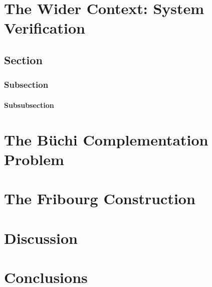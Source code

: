 \documentclass{scrreprt}
\begin{document}



\chapter{The Wider Context: System Verification}
\section{Section} %
\subsection{Subsection} %
\subsubsection{Subsubsection} %

\chapter{The B\"uchi Complementation Problem}

\chapter{The Fribourg Construction}

\chapter{Discussion}

\chapter{Conclusions}
\end{document}
